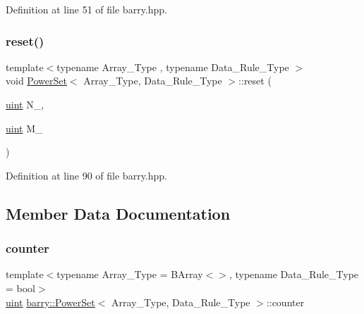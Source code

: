 Definition at line 51 of file barry.\+hpp.

\mbox{\label{classbarry_1_1_power_set_aba11dd8802cd2eb529c7c30b55994248}} 
\subsubsection{\texorpdfstring{reset()}{reset()}}
{\footnotesize\ttfamily template$<$typename Array\+\_\+\+Type , typename Data\+\_\+\+Rule\+\_\+\+Type $>$ \\
void \hyperlink{classbarry_1_1_power_set}{Power\+Set}$<$ Array\+\_\+\+Type, Data\+\_\+\+Rule\+\_\+\+Type $>$\+::reset (\begin{DoxyParamCaption}\item[{\hyperlink{namespacebarry_a11dfc53ddb4672278319aa04f1e09a6c}{uint}}]{N\+\_\+,  }\item[{\hyperlink{namespacebarry_a11dfc53ddb4672278319aa04f1e09a6c}{uint}}]{M\+\_\+ }\end{DoxyParamCaption})\hspace{0.3cm}{\ttfamily [inline]}}



Definition at line 90 of file barry.\+hpp.



\subsection{Member Data Documentation}
\mbox{\label{classbarry_1_1_power_set_a54ba0ae826c51b9bd34235bdbe172851}} 
\subsubsection{\texorpdfstring{counter}{counter}}
{\footnotesize\ttfamily template$<$typename Array\+\_\+\+Type  = B\+Array$<$$>$, typename Data\+\_\+\+Rule\+\_\+\+Type  = bool$>$ \\
\hyperlink{namespacebarry_a11dfc53ddb4672278319aa04f1e09a6c}{uint} \hyperlink{classbarry_1_1_power_set}{barry\+::\+Power\+Set}$<$ Array\+\_\+\+Type, Data\+\_\+\+Rule\+\_\+\+Type $>$\+::counter}



